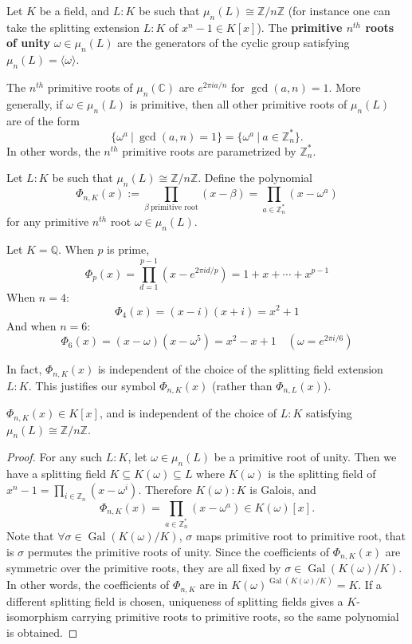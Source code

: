 \begin{definition}
Let $K$ be a field, and $L:K$ be such that $\mu_n(L) \cong \mathbb{Z}/n\mathbb{Z}$ (for instance one can take the splitting extension $L:K$ of $x^n-1 \in K[x]$). The {\bf primitive $n^{th}$ roots of unity} $\omega \in \mu_n(L)$ are the generators of the cyclic group satisfying $\mu_n(L) = \langle \omega \rangle$.
\end{definition}

\begin{example} \label{eg-primroots}
    The $n^{th}$ primitive roots of $\mu_n(\mathbb{C})$ are $e^{2\pi i a/n}$ for $\gcd(a,n) = 1$.
    More generally, if $\omega \in \mu_n(L)$ is primitive, then all other primitive roots of $\mu_n(L)$ are of the form
    $$\{\omega^a\ |\ \gcd(a,n) = 1\} = \{\omega^a\ |\ a \in \mathbb{Z}_n^*\}.$$
    In other words, the $n^{th}$ primitive roots are parametrized by $\mathbb{Z}_n^*$.
\end{example}

\begin{definition}
    Let $L:K$ be such that $\mu_n(L) \cong \mathbb{Z}/n \mathbb{Z}$. Define the polynomial
    $$\Phi_{n,K}(x) := \prod_{\beta\ \text{primitive root}}(x-\beta) = \prod_{a \in \mathbb{Z}_n^*}(x-\omega^a)$$
for any primitive $n^{th}$ root $\omega \in \mu_n(L)$.
\end{definition}
\begin{example}
Let $K = \mathbb{Q}$. When $ p $ is prime,
$$
\Phi_p(x) = \prod_{d=1}^{p-1} \left(x - e^{2\pi i d/p}\right) = 1 + x + \cdots + x^{p-1}
$$
When $ n = 4 $:
$$
\Phi_4(x) = (x - i)(x + i) = x^2 + 1 
$$
And when $ n = 6 $:
$$
\Phi_6(x) = (x - \omega)(x - \omega^5) = x^2 - x + 1 \quad (\omega = e^{2\pi i/6})
$$
\end{example}
In fact, $\Phi_{n,K}(x)$ is independent of the choice of the splitting field extension $L:K$. This justifies our symbol $\Phi_{n,K}(x)$ (rather than $\Phi_{n,L}(x)$).
\begin{lemma}
    $\Phi_{n,K}(x)\in K[x] $, and is independent of the choice of $L:K$ satisfying $\mu_n(L) \cong \mathbb{Z}/n\mathbb{Z}$.
\end{lemma}
\begin{proof}
    For any such $L:K$, let $\omega \in \mu_n(L)$ be a primitive root of unity. Then we have a splitting field $K\subseteq K(\omega) \subseteq L$ where $K(\omega)$ is the splitting field of $x^n-1 = \prod_{i \in \mathbb{Z}_n}(x-\omega^i)$. Therefore $K(\omega):K$ is Galois, and 
    $$\Phi_{n,K}(x) = \prod_{a \in \mathbb{Z}_n^*}(x-\omega^a) \in K(\omega)[x].$$ 
    Note that $\forall \sigma \in \operatorname{Gal}(K(\omega)/K)$, $\sigma$ maps primitive root to primitive root, that is $\sigma$ permutes the primitive roots of unity. 
    Since the coefficients of $\Phi_{n,K}(x)$ are symmetric over the primitive roots, they are all fixed by $\sigma \in \operatorname{Gal}(K(\omega)/K)$. In other words, the coefficients of $\Phi_{n,K}$ are 
    in $K(\omega)^{\operatorname{Gal}(K(\omega)/K)}=K$. If a different splitting field is chosen, uniqueness of splitting fields gives a $K$-isomorphism carrying primitive roots to primitive roots, so the same polynomial is obtained.
\end{proof}

